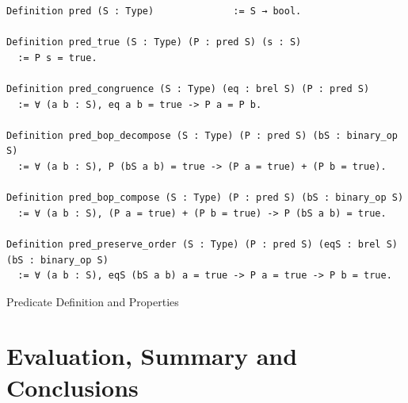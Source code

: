 \documentclass[a4paper,12pt,twoside,openright]{report}
\begin{document}
\begin{listing}[H]
\begin{verbatim}
Definition pred (S : Type)              := S → bool.

Definition pred_true (S : Type) (P : pred S) (s : S) 
  := P s = true. 

Definition pred_congruence (S : Type) (eq : brel S) (P : pred S) 
  := ∀ (a b : S), eq a b = true -> P a = P b.

Definition pred_bop_decompose (S : Type) (P : pred S) (bS : binary_op S) 
  := ∀ (a b : S), P (bS a b) = true -> (P a = true) + (P b = true).

Definition pred_bop_compose (S : Type) (P : pred S) (bS : binary_op S) 
  := ∀ (a b : S), (P a = true) + (P b = true) -> P (bS a b) = true.

Definition pred_preserve_order (S : Type) (P : pred S) (eqS : brel S) (bS : binary_op S)
  := ∀ (a b : S), eqS (bS a b) a = true -> P a = true -> P b = true.
\end{verbatim}
\caption{Predicate Definition and Properties} 
\label{coq:def:predicate}
\end{listing}


\chapter{Evaluation, Summary and Conclusions} 


%




\appendix
\singlespacing

 

\end{document}
